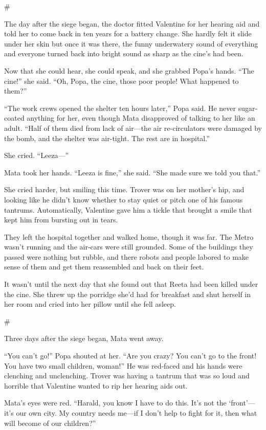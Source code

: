 \#

The day after the siege began, the doctor fitted Valentine for her
hearing aid and told her to come back in ten years for a battery
change. She hardly felt it slide under her skin but once it was
there, the funny underwatery sound of everything and everyone
turned back into bright sound as sharp as the cine’s had been.

Now that she could hear, she could speak, and she grabbed Popa’s
hands. “The cine!” she said. “Oh, Popa, the cine, those poor
people! What happened to them?”

“The work crews opened the shelter ten hours later,” Popa said. He
never sugar-coated anything for her, even though Mata disapproved
of talking to her like an adult. “Half of them died from lack of
air—the air re-circulators were damaged by the bomb, and the
shelter was air-tight. The rest are in hospital.”

She cried. “Leeza—”

Mata took her hands. “Leeza is fine,” she said. “She made sure we
told you that.”

She cried harder, but smiling this time. Trover was on her mother’s
hip, and looking like he didn’t know whether to stay quiet or pitch
one of his famous tantrums. Automatically, Valentine gave him a
tickle that brought a smile that kept him from bursting out in
tears.

They left the hospital together and walked home, though it was far.
The Metro wasn’t running and the air-cars were still grounded. Some
of the buildings they passed were nothing but rubble, and there
robots and people labored to make sense of them and get them
reassembled and back on their feet.

It wasn’t until the next day that she found out that Reeta had been
killed under the cine. She threw up the porridge she’d had for
breakfast and shut herself in her room and cried into her pillow
until she fell asleep.

\#

Three days after the siege began, Mata went away.

“You can’t go!” Popa shouted at her. “Are you crazy? You can’t go
to the front! You have two small children, woman!” He was red-faced
and his hands were clenching and unclenching. Trover was having a
tantrum that was so loud and horrible that Valentine wanted to rip
her hearing aids out.

Mata’s eyes were red. “Harald, you know I have to do this. It’s not
the ‘front’—it’s our own city. My country needs me—if I don’t help
to fight for it, then what will become of our children?”

